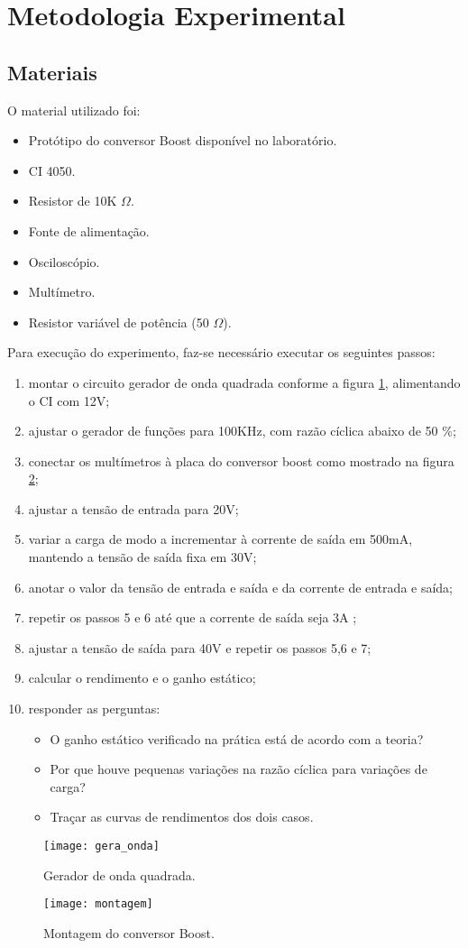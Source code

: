 \newpage
\section{Metodologia Experimental}

\subsection{Materiais}
O material utilizado foi:

\begin{itemize}
	\item Protótipo do conversor Boost disponível no laboratório.
	\item CI 4050.
	\item Resistor de 10K $\Omega$.
	\item Fonte de alimentação.
	\item Osciloscópio.
	\item Multímetro.
	\item Resistor variável de potência (50 $\Omega$).
\end{itemize}

Para execução do experimento, faz-se necessário executar os seguintes passos:

\begin{enumerate}
	\item montar o circuito gerador de onda quadrada conforme a figura \ref{f_gera_onda}, alimentando o CI com 12V;
	\item ajustar o gerador de funções para 100KHz, com razão cíclica abaixo de 50 \%;
	\item conectar os multímetros à placa do conversor boost como mostrado na figura \ref{f_buck};
	\item ajustar a tensão de entrada para 20V;
	\item variar a carga de modo a incrementar à corrente de saída em 500mA, mantendo a tensão de saída fixa em 30V;
	\item anotar o valor da tensão de entrada e saída e da corrente de entrada e saída;
	\item repetir os passos 5 e 6 até que a corrente de saída seja 3A ;
	\item ajustar a tensão de saída para 40V e repetir os passos 5,6 e 7;
	\item calcular o rendimento e o ganho estático;
	\item responder as perguntas:
	\begin{itemize}
		\item O ganho estático verificado na prática está de acordo com a teoria?
		\item Por que houve pequenas variações na razão cíclica para variações de carga?
		\item Traçar as curvas de rendimentos dos dois casos.
	\end{itemize}
\end{enumerate}

\begin{figure}[H]
	\centering
	\caption{Gerador de onda quadrada.}
	\texttt{[image: gera\_onda]}
	\label{f_gera_onda}
\end{figure}

\begin{figure}[H]
	\centering
	\caption{Montagem do conversor Boost.}
	\texttt{[image: montagem]}
	\label{f_buck}
\end{figure}

